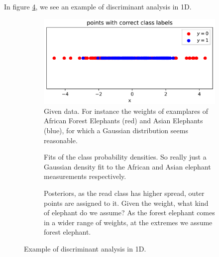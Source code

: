 In figure \ref{fig:discriminant_analysis}, we see an example of discriminant analysis in 1D.

\begin{figure}

    \centering
    \begin{subfigure}{0.55\textwidth}
      \centering
      \includegraphics[width=.95\linewidth]{figures/dist.pdf}
      \caption{Given data. For instance the weights of examplares of African Forest Elephants (red) and Asian Elephants (blue), for which a Gaussian distribution
      seems reasonable.}
      \label{fig:discriminant_analysis_data}
    \end{subfigure}%



    \begin{subfigure}{0.55\textwidth}
      \centering
      
      \caption{Fits of the class probability densities. So really just a Gaussian density fit to the African and Asian elephant measurements respectively.}
      \label{fig:discriminant_analysis_fits}
    \end{subfigure}



    \begin{subfigure}{0.55\textwidth}
        \centering
        
        \caption{Posteriors, as the read class has higher spread, outer points are assigned to it. Given the weight, what kind of elephant do we assume?
        As the forest elephant comes in a wider range of weights, at the extremes we assume forest elephant.}
        \label{fig:discriminant_analysis_posteriors}
      \end{subfigure}

    \caption{Example of discriminant analysis in 1D.}
    \label{fig:discriminant_analysis}

\end{figure}


